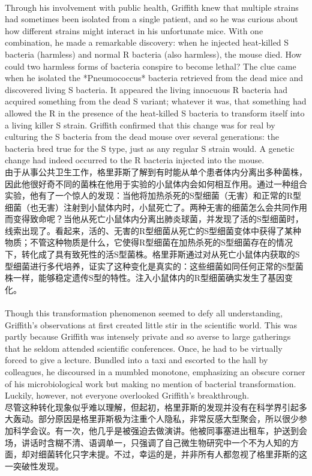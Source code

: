 \documentclass{article}
\begin{document}
\\
Through his involvement with public health, Griffith knew that multiple strains had sometimes been isolated from a single patient, and so he was curious about how different strains might interact in his unfortunate mice. With one combination, he made a remarkable discovery: when he injected heat-killed S bacteria (harmless) and normal R bacteria (also harmless), the mouse died. How could two harmless forms of bacteria conspire to become lethal? The clue came when he isolated the *Pneumococcus* bacteria retrieved from the dead mice and discovered living S bacteria. It appeared the living innocuous R bacteria had acquired something from the dead S variant; whatever it was, that something had allowed the R in the presence of the heat-killed S bacteria to transform itself into a living killer S strain. Griffith confirmed that this change was for real by culturing the S bacteria from the dead mouse over several generations: the bacteria bred true for the S type, just as any regular S strain would. A genetic change had indeed occurred to the R bacteria injected into the mouse.\\
由于从事公共卫生工作，格里菲斯了解到有时能从单个患者体内分离出多种菌株，因此他很好奇不同的菌株在他用于实验的小鼠体内会如何相互作用。通过一种组合实验，他有了一个惊人的发现：当他将加热杀死的S型细菌（无害）和正常的R型细菌（也无害）注射到小鼠体内时，小鼠死亡了。两种无害的细菌怎么会共同作用而变得致命呢？当他从死亡小鼠体内分离出肺炎球菌，并发现了活的S型细菌时，线索出现了。看起来，活的、无害的R型细菌从死亡的S型细菌变体中获得了某种物质；不管这种物质是什么，它使得R型细菌在加热杀死的S型细菌存在的情况下，转化成了具有致死性的活S型菌株。格里菲斯通过对从死亡小鼠体内获取的S型细菌进行多代培养，证实了这种变化是真实的：这些细菌如同任何正常的S型菌株一样，能够稳定遗传S型的特性。注入小鼠体内的R型细菌确实发生了基因变化。 \\

\\
Though this transformation phenomenon seemed to defy all understanding, Griffith’s observations at first created little stir in the scientific world. This was partly because Griffith was intensely private and so averse to large gatherings that he seldom attended scientific conferences. Once, he had to be virtually forced to give a lecture. Bundled into a taxi and escorted to the hall by colleagues, he discoursed in a mumbled monotone, emphasizing an obscure corner of his microbiological work but making no mention of bacterial transformation. Luckily, however, not everyone overlooked Griffith’s breakthrough.\\
尽管这种转化现象似乎难以理解，但起初，格里菲斯的发现并没有在科学界引起多大轰动。部分原因是格里菲斯极为注重个人隐私，非常反感大型聚会，所以很少参加科学会议。有一次，他几乎是被强迫去做演讲。他被同事塞进出租车，护送到会场，讲话时含糊不清、语调单一，只强调了自己微生物研究中一个不为人知的方面，却对细菌转化只字未提。不过，幸运的是，并非所有人都忽视了格里菲斯的这一突破性发现。 \\
\end{document}
